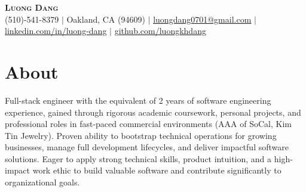 \documentclass[letterpaper,10pt]{article}
\begin{document}
\begin{center}
    \textbf{\Huge \scshape Luong Dang} \\ \vspace{1pt} %
    \small %
    (510)-541-8379 $|$
    \small %
    Oakland, CA (94609) $|$
    \href{mailto:luongdang0701@gmail.com}{\underline{luongdang0701@gmail.com}} $|$
    \href{https://linkedin.com/in/luong-dang}{\underline{linkedin.com/in/luong-dang}} $|$
    \href{https://github.com/luongkhdang}{\underline{github.com/luongkhdang}}
\end{center}

\section{About} 
\small{\justifying %
Full-stack engineer with the equivalent of 2 years of software engineering experience, gained through rigorous academic coursework, personal projects, and professional roles in fast-paced commercial environments (AAA of SoCal, Kim Tin Jewelry). Proven ability to bootstrap technical operations for growing businesses, manage full development lifecycles, and deliver impactful software solutions. Eager to apply strong technical skills, product intuition, and a high-impact work ethic to build valuable software and contribute significantly to organizational goals.
} %

\end{document}
